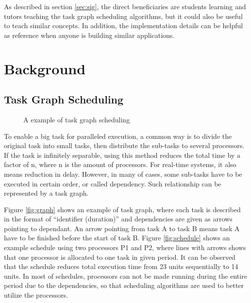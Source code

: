 \documentclass[a4paper,11pt]{article}
\begin{document}
As described in section \ref{sec:sig}, the direct beneficiaries are students learning and tutors teaching the task graph scheduling algorithms, but it could also be useful to teach similar concepts. In addition, the implementation details can be helpful as reference when anyone is building similar applications. 

\section{Background}

\subsection{Task Graph Scheduling} \label{sec:tgs}

\begin{figure}[htpb]
    \centering
     \hspace{2em}
    \caption{A example of task graph scheduling}
    \label{fig:example}
\end{figure}

To enable a big task for paralleled execution, a common way is to divide the original task into small tasks, then distribute the sub-tasks to several processors. If the task is infinitely separable, using this method reduces the total time by a factor of n, where n is the amount of processors. For real-time systems, it also means reduction in delay. However, in many of cases, some sub-tasks have to be executed in certain order, or called dependency. Such relationship can be represented by a task graph.

Figure \ref{fig:graph} shows an example of task graph, where each task is described in the format of ``identifier (duration)'' and dependencies are given as arrows pointing to dependant. An arrow pointing from task A to task B means task A have to be finished before the start of task B. Figure \ref{fig:schedule} shows an example schedule using two processors P1 and P2, where lines with arrows shows that one processor is allocated to one task in given period. It can be observed that the schedule reduces total execution time from 23 units sequentially to 14 units. In most of schedules, processors can not be made running during the entire period due to the dependencies, so that scheduling algorithms are used to better utilize the processors.
\end{document}
